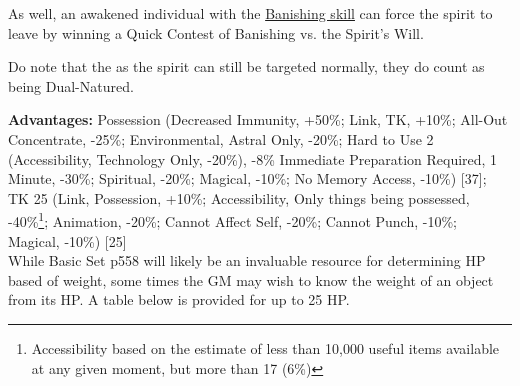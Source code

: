 \begin{multicols*}{3}
	As well, an awakened individual with the \hyperref[banishing]{Banishing skill} can force the spirit to leave by winning a Quick Contest of Banishing vs. the Spirit's Will.
	
	Do note that the as the spirit can still be targeted normally, they do count as being Dual-Natured.
	
	\textbf{Advantages:} Possession (Decreased Immunity, +50\%; Link, TK, +10\%; All-Out Concentrate, -25\%; Environmental, Astral Only, -20\%; Hard to Use 2 (Accessibility, Technology Only, -20\%), -8\% Immediate Preparation Required, 1 Minute, -30\%; Spiritual, -20\%; Magical, -10\%; No Memory Access, -10\%) [37]; TK 25 (Link, Possession, +10\%; Accessibility, Only things being possessed, -40\%\footnote{Accessibility based on the estimate of less than 10,000 useful items available at any given moment, but more than 17 (6\%)}; Animation, -20\%; Cannot Affect Self, -20\%; Cannot Punch, -10\%; Magical, -10\%) [25]\\
	
	While Basic Set p558 will likely be an invaluable resource for determining HP based of weight, some times the GM may wish to know the weight of an object from its HP. A table below is provided for up to 25 HP.
	

\end{multicols*}
